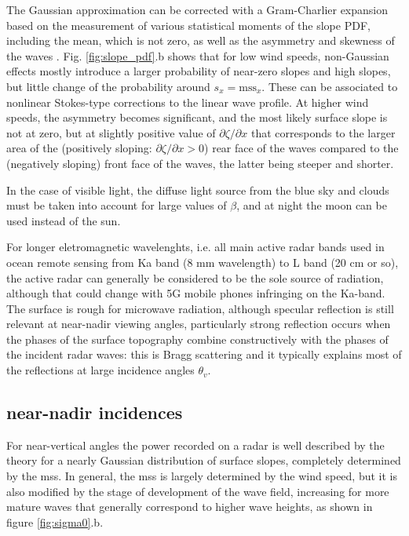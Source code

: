 The Gaussian approximation can be corrected with a Gram-Charlier expansion based on the measurement of various statistical  moments of the slope PDF, including the mean, which is not zero, as well as the asymmetry and skewness of the waves \citep{Cox&Munk1954,Munk2009}. Fig. \ref{fig:slope_pdf}.b shows that for low wind speeds, non-Gaussian effects mostly introduce a larger probability of near-zero slopes and high slopes, but little change of the probability around $s_x=\mathrm{mss}_x$. These can be associated to nonlinear Stokes-type corrections to the linear wave profile. At higher wind speeds, the asymmetry becomes significant, and the most likely surface slope is not at zero, but at slightly positive value of $\partial \zeta/ \partial x$ that corresponds to the larger area of the (positively sloping: $\partial \zeta/ \partial x > 0$) rear face of the waves compared to the (negatively sloping) front face of the waves, the latter being steeper and shorter. 

In the case of visible light,  the diffuse light source from the blue sky and clouds must be taken into account for large values of $\beta$, and at night the moon can be used instead of the sun. 

For longer eletromagnetic wavelenghts, i.e. all main active radar bands used in ocean remote sensing from Ka band (8 mm wavelength) to L band (20 cm or so), the active radar can generally be considered to be the sole source of radiation, although that could change with 5G mobile phones infringing on the Ka-band. %
 The surface is rough for microwave radiation, although specular reflection is still relevant at near-nadir viewing angles, particularly strong reflection occurs when the phases of the surface topography combine constructively with the phases of the incident radar waves: this is Bragg scattering and it typically explains most of the reflections at large incidence angles $\theta_v$.

\subsection{near-nadir incidences}
For near-vertical angles the power recorded on a radar is well described by the theory for a nearly Gaussian distribution of surface slopes, 
completely determined by the mss. In general, the mss is largely determined by the wind speed, but it is also modified by the stage of  development of the wave field, increasing for more mature waves that generally correspond to higher wave heights, as shown in figure 
\ref{fig:sigma0}.b. 

